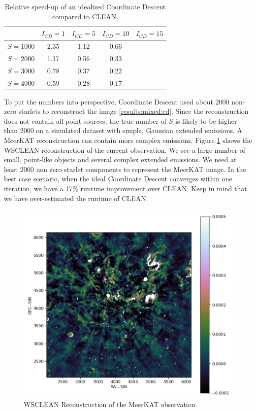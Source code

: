 \begin{table}[h!]
	\begin{center}
		\begin{tabular}{l|c|c|c|c} %
			 & $I_{CD} = 1$ & $I_{CD} = 5$ &  $I_{CD} = 10$ &  $I_{CD} = 15$\\
			\hline
			$S=1000$ & 2.35 & 1.12 & 0.66 & \\
			$S=2000$ & 1.17 & 0.56 & 0.33 &\\
			$S=3000$ & 0.78 & 0.37 & 0.22 &\\
			$S=4000$ & 0.59 & 0.28 & 0.17 & \\
		\end{tabular}
		\caption{Relative speed-up of an idealized Coordinate Descent compared to CLEAN.}
		\label{res:cd:table}
	\end{center}
\end{table}

To put the numbers into perspective, Coordinate Descent used about 2000 non-zero starlets to reconstruct the image \ref{results:mixed:cd}. Since the reconstruction does not contain all point sources, the true number of $S$ is likely to be higher than 2000 on a simulated dataset with simple, Gaussian extended emissions. A MeerKAT reconstruction can contain more complex emissions. Figure \ref{results:wsclean} shows the WSCLEAN reconstruction of the current observation. We see a large number of small, point-like objects and several complex extended emissions. We need at least 2000 non zero starlet components to represent the MeerKAT image. In the best case scenario, when the ideal Coordinate Descent converges within one iteration, we have a 17\% runtime improvement over CLEAN. Keep in mind that we have over-estimated the runtime of CLEAN.

\begin{figure}[h]
	\centering
	\includegraphics[width=0.6\linewidth]{./chapters/20.results/meerkat.png}
	\caption{WSCLEAN Reconstruction of the MeerKAT observation.}
	\label{results:wsclean}
\end{figure}


